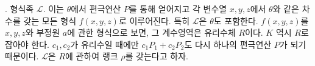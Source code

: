 
. 형식족 $\mathcal L$. 이는 $\theta$에서 편극연산 $P$를 통해 얻어지고 각 변수열 $x,y,z$에서 $\theta$와 같은 차수를 갖는 모든 형식 $f(x,y,z)$로 이루어진다. 특히 $\mathcal L$은 $\theta$도 포함한다. $f(x,y,z)$를 $x,y,z$와 부정원 $a$에 관한 형식으로 보면, 그 계수영역은 유리수체 $R$이다. $K$ 역시 $R$로 잡아야 한다. $c_1,c_2$가 유리수일 때에만 $c_1P_1+c_2P_2$도 다시 하나의 편극연산 $P$가 되기 때문이다. $\mathcal L$은 $R$에 관하여 랭크 $\rho$를 갖는다고 하자.
